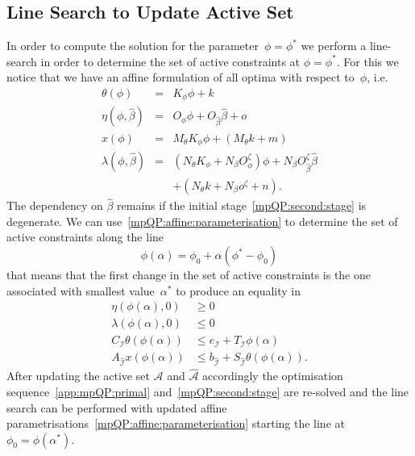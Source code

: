 \documentclass[journal]{IEEEtran}
\theoremstyle{remark}
\theoremstyle{definition}
\begin{document}
\subsection{Line Search to Update Active Set}\label{ssec:line:search}
%
In order to compute the solution for the parameter~$\phi = \phi^\ast$ we perform a line-search in order
to determine the set of active constraints at $\phi = \phi^\ast$.
%
For this we notice that we have an affine formulation of all optima with respect to~$\phi$, i.e.
%
\begin{equation}\label{mpQP:affine:parameterisation}
  \begin{array}{rcl} 
  \theta(\phi) &=&K_\phi \phi + k\\
  \eta(\phi,\hat \beta) &=& O_\phi \phi + O_{\hat\beta}\hat\beta + o\\
  x(\phi) &=& M_\theta K_\phi \phi + (M_\theta k+ m)\\
  \lambda(\phi, \hat\beta) &=& (N_\theta K_\phi + N_\beta O^\zeta_\phi)\phi + 
  N_\beta O^\zeta_{\hat\beta}\hat\beta\\ & &+ (N_\theta k + N_\beta o^\zeta + n) .
  \end{array}
\end{equation}
%
The dependency on $\hat\beta$ remains if the initial stage~\eqref{mpQP:second:stage} is degenerate.
%
We can use~\eqref{mpQP:affine:parameterisation} to determine the set of active constraints along the line
%
\begin{equation}
  \phi(\alpha) = \phi_0 + \alpha(\phi^\ast-\phi_0)
\end{equation}
%
that means that the first change in the set of active constraints is the one associated with smallest
value~$\alpha^\ast$ to produce an equality in
%
\begin{equation}\label{mpQP:conditions:for:the:line:search}
  \begin{split}
  \eta(\phi(\alpha),0)&\geq0\\
  \lambda(\phi(\alpha),0)&\leq0\\
  C_{\mathcal I}\theta(\phi(\alpha))&\leq e_{\mathcal I} + T_{\mathcal I}\phi(\alpha)\\
  A_{\hat{\mathcal I}}x(\phi(\alpha))&\leq b_{\hat{\mathcal I}}+S_{\hat{\mathcal I}}\theta(\phi(\alpha)).
  \end{split}
\end{equation}
%
After updating the active set $\mathcal A$ and $\hat{\mathcal A}$ accordingly the optimisation sequence~\eqref{app:mpQP:primal}
and~\eqref{mpQP:second:stage} are re-solved and the line search can be performed with updated affine 
parametrisations~\eqref{mpQP:affine:parameterisation} starting the line at~$\phi_0=\phi(\alpha^\ast)$.
\end{document}
